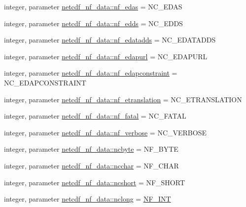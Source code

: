 \begin{DoxyCompactItemize}
\item 
integer, parameter \hyperlink{namespacenetcdf__nf__data_a6caa9dfbf83999c20a69beafb82c941c}{netcdf\+\_\+nf\+\_\+data\+::nf\+\_\+edas} = N\+C\+\_\+\+E\+D\+AS
\item 
integer, parameter \hyperlink{namespacenetcdf__nf__data_a2572d1be05fd530ae081c05d97f9f77c}{netcdf\+\_\+nf\+\_\+data\+::nf\+\_\+edds} = N\+C\+\_\+\+E\+D\+DS
\item 
integer, parameter \hyperlink{namespacenetcdf__nf__data_a79a56354e9b7c1c468dd56ca7e494a17}{netcdf\+\_\+nf\+\_\+data\+::nf\+\_\+edatadds} = N\+C\+\_\+\+E\+D\+A\+T\+A\+D\+DS
\item 
integer, parameter \hyperlink{namespacenetcdf__nf__data_a8f7e5d7283d0868d04f159d8662a3118}{netcdf\+\_\+nf\+\_\+data\+::nf\+\_\+edapurl} = N\+C\+\_\+\+E\+D\+A\+P\+U\+RL
\item 
integer, parameter \hyperlink{namespacenetcdf__nf__data_a1bab6ea4c1e0d0aa0d6726e4b45148a8}{netcdf\+\_\+nf\+\_\+data\+::nf\+\_\+edapconstraint} = N\+C\+\_\+\+E\+D\+A\+P\+C\+O\+N\+S\+T\+R\+A\+I\+NT
\item 
integer, parameter \hyperlink{namespacenetcdf__nf__data_ae5193f73e56230ac54049c56eaa0ef61}{netcdf\+\_\+nf\+\_\+data\+::nf\+\_\+etranslation} = N\+C\+\_\+\+E\+T\+R\+A\+N\+S\+L\+A\+T\+I\+ON
\item 
integer, parameter \hyperlink{namespacenetcdf__nf__data_ac9327edbd57889437ca36e4c7a37a94b}{netcdf\+\_\+nf\+\_\+data\+::nf\+\_\+fatal} = N\+C\+\_\+\+F\+A\+T\+AL
\item 
integer, parameter \hyperlink{namespacenetcdf__nf__data_ae025322805025e9a39302e4e1a5405e8}{netcdf\+\_\+nf\+\_\+data\+::nf\+\_\+verbose} = N\+C\+\_\+\+V\+E\+R\+B\+O\+SE
\item 
integer, parameter \hyperlink{namespacenetcdf__nf__data_ad9bf91b06b1fdc0e91ab484cb2839ea2}{netcdf\+\_\+nf\+\_\+data\+::ncbyte} = N\+F\+\_\+\+B\+Y\+TE
\item 
integer, parameter \hyperlink{namespacenetcdf__nf__data_a53599db94e3b9cc94d5190dbb56bf1d7}{netcdf\+\_\+nf\+\_\+data\+::ncchar} = N\+F\+\_\+\+C\+H\+AR
\item 
integer, parameter \hyperlink{namespacenetcdf__nf__data_a61a645d51c75f3799902d5ad2ec1d35f}{netcdf\+\_\+nf\+\_\+data\+::ncshort} = N\+F\+\_\+\+S\+H\+O\+RT
\item 
integer, parameter \hyperlink{namespacenetcdf__nf__data_a0da55fa021c2f3d2712d1ec30c4973d3}{netcdf\+\_\+nf\+\_\+data\+::nclong} = \hyperlink{ncfortran_8h_aec6fe8ae8c73cf5133d4ed64f86ff028}{N\+F\+\_\+\+I\+NT}
\item 

\end{DoxyCompactItemize}
